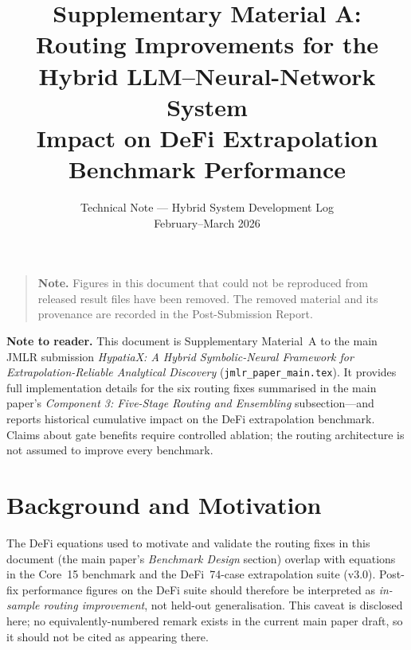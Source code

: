 \documentclass[twoside,11pt]{article}
\begin{document}
\title{%
  Supplementary Material A:\\
  Routing Improvements for the Hybrid LLM--Neural-Network System\\
  \large Impact on DeFi Extrapolation Benchmark Performance
}
\author{\name Technical Note --- Hybrid System Development Log \email{} \\
       \addr February--March 2026}
\maketitle

\begin{quote}\small
\textbf{Note.} Figures in this document that could not be reproduced from released
result files have been removed. The removed material and its provenance
are recorded in the Post-Submission Report.
\end{quote}

\tableofcontents
\bigskip

\noindent\textbf{Note to reader.}  This document is Supplementary Material~A to
the main JMLR submission \emph{HypatiaX: A Hybrid Symbolic-Neural Framework for
Extrapolation-Reliable Analytical Discovery} (\texttt{jmlr\_paper\_main.tex}).
It provides full implementation details for the six routing fixes summarised in the main paper's \emph{Component 3: Five-Stage Routing and Ensembling} subsection---and reports historical cumulative impact on the DeFi extrapolation benchmark.
Claims about gate benefits require controlled ablation; the routing architecture
is not assumed to improve every benchmark.

\section{Background and Motivation}
\label{sec:background}

\begin{remark}
The DeFi equations used to motivate and validate the routing fixes in this
document (the main paper's \emph{Benchmark Design} section) overlap with equations in the Core~15
benchmark and the DeFi~74-case extrapolation suite (v3.0).  Post-fix performance
figures on the DeFi suite should therefore be interpreted as
\emph{in-sample routing improvement}, not held-out generalisation.
This caveat is disclosed here; no equivalently-numbered remark exists in
the current main paper draft, so it should not be cited as appearing there.
\end{remark}
\end{document}
